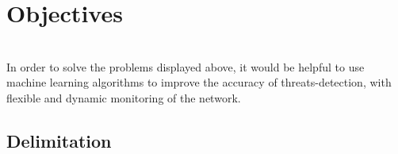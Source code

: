 
\section{Objectives}
\label{sec:objectives}

\lipsum[1-2] \\
In order to solve the problems displayed above, it would be helpful to use machine learning algorithms to improve the accuracy of threats-detection, with flexible and dynamic monitoring of the network.


\subsection{Delimitation}
\label{subsec:delimitation}

\lipsum[1]

